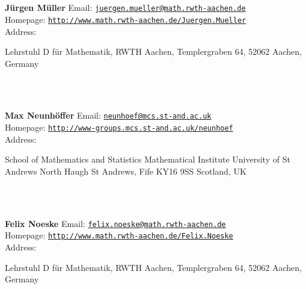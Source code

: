 \documentclass[a4paper,11pt]{report}
\begin{document}
\begin{titlepage}
\mbox{}\\
{\mbox{}\\
\small \noindent \textbf{J{\"u}rgen M{\"u}ller    }  Email: \href{mailto://juergen.mueller@math.rwth-aachen.de} {\texttt{juergen.mueller@math.rwth-aachen.de}}\\
  Homepage: \href{http://www.math.rwth-aachen.de/~Juergen.Mueller} {\texttt{http://www.math.rwth-aachen.de/\texttt{}Juergen.Mueller}}\\
  Address: \begin{minipage}[t]{8cm}\noindent
 Lehrstuhl D f{\"u}r Mathematik, RWTH Aachen, Templergraben 64, 52062 Aachen,
Germany \end{minipage}
}\\
{\mbox{}\\
\small \noindent \textbf{Max Neunh{\"o}ffer    }  Email: \href{mailto://neunhoef@mcs.st-and.ac.uk} {\texttt{neunhoef@mcs.st-and.ac.uk}}\\
  Homepage: \href{http://www-groups.mcs.st-and.ac.uk/~neunhoef} {\texttt{http://www-groups.mcs.st-and.ac.uk/\texttt{}neunhoef}}\\
  Address: \begin{minipage}[t]{8cm}\noindent
 School of Mathematics and Statistics Mathematical Institute University of St
Andrews North Haugh St Andrews, Fife KY16 9SS Scotland, UK \end{minipage}
}\\
{\mbox{}\\
\small \noindent \textbf{Felix Noeske    }  Email: \href{mailto://felix.noeske@math.rwth-aachen.de} {\texttt{felix.noeske@math.rwth-aachen.de}}\\
  Homepage: \href{http://www.math.rwth-aachen.de/~Felix.Noeske} {\texttt{http://www.math.rwth-aachen.de/\texttt{}Felix.Noeske}}\\
  Address: \begin{minipage}[t]{8cm}\noindent
 Lehrstuhl D f{\"u}r Mathematik, RWTH Aachen, Templergraben 64, 52062 Aachen,
Germany \end{minipage}
}\\
\end{titlepage}
\end{document}
